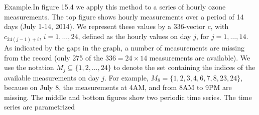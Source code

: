 Example.In figure 15.4 we apply this method to a series of hourly ozone measurements. The top figure shows hourly measurements over a period of 14 days (July 1-14, 2014). We represent these values by a 336-vector \(c\), with \(c_{24(j-1)+i}\), \(i=1,\ldots,24\), defined as the hourly values on day \(j\), for \(j=1,\ldots,14\). As indicated by the gaps in the graph, a number of measurements are missing from the record (only 275 of the \(336=24\times 14\) measurements are available). We use the notation \(M_{j}\subseteq\{1,2,\ldots,24\}\) to denote the set containing the indices of the available measurements on day \(j\). For example, \(M_{8}=\{1,2,3,4,6,7,8,23,24\}\), because on July 8, the measurements at 4AM, and from 8AM to 9PM are missing. The middle and bottom figures show two periodic time series. The time series are parametrized 